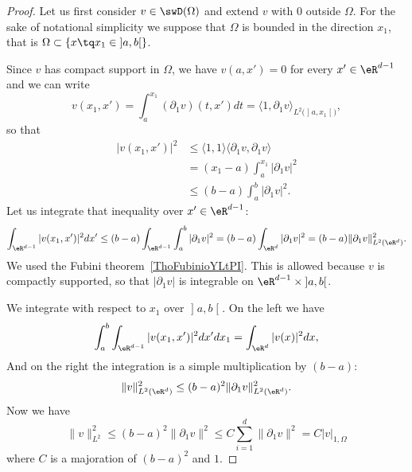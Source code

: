 \begin{proof}
	Let us first consider \( v\in\swD(\Omega)\) and extend \( v\) with \( 0\) outside \( \Omega\). For the sake of notational simplicity we suppose that \( \Omega\) is bounded in the direction \( x_1\), that is \( \Omega\subset \{ x\tq x_1\in \mathopen] a , b \mathclose[ \}\).

		Since \( v\) has compact support in \( \Omega\), we have \( v(a,x')=0\) for every \( x'\in \eR^{d-1}\) and we can write
		\begin{equation}
			v(x_1,x')=   \int_a^{x_1}(\partial_1v)(t,x')dt=\langle 1, \partial_1v\rangle_{L^2\big( \mathopen] a , x_1 \mathclose[ \big)},
		\end{equation}
		so that
		\begin{subequations}
			\begin{align}
				| v(x_1,x') |^2 & \leq \langle 1, 1\rangle \langle \partial_1v, \partial_1v\rangle \\
				                & =(x_1-a)\int_a^{x_1}| \partial_1 v|^2                            \\
				                & \leq(b-a)\int_a^b| \partial_1v |^2.
			\end{align}
		\end{subequations}
		Let us integrate that inequality over \( x'\in \eR^{d-1}\):
		\begin{equation}
			\int_{\eR^{d-1}}| v(x_1,x') |^2dx'\leq (b-a)\int_{\eR^{d-1}}\int_a^b| \partial_1v |^2=(b-a)\int_{\eR^d}| \partial_1v |^2=(b-a)\| \partial_1v \|^2_{L^2(\eR^d)}.
		\end{equation}
		We used the Fubini theorem~\ref{ThoFubinioYLtPI}. This is allowed because \( v\) is compactly supported, so that \( | \partial_1v |\) is integrable on \( \eR^{d-1}\times \mathopen] a , b \mathclose[\).

		We integrate with respect to \( x_1\) over \( \mathopen] a , b \mathclose[\). On the left we have
	\begin{equation}
		\int_a^b\int_{\eR^{d-1}}| v(x_1,x') |^2dx'dx_1=\int_{\eR^d}| v(x) |^2dx,
	\end{equation}
	And on the right the integration is a simple multiplication by \( (b-a)\):
	\begin{equation}
		\| v \|^2_{L^2(\eR^d)}\leq (b-a)^2\| \partial_1v \|^2_{L^2(\eR^d)}.
	\end{equation}
	Now we have
	\begin{equation}
		\| v \|^2_{L^2}\leq (b-a)^2\| \partial_1v \|^2\leq C\sum_{i=1}^d\| \partial_1v \|^2=C| v |_{1,\Omega}
	\end{equation}
	where \( C\) is a majoration of \( (b-a)^2\) and \( 1\).


\end{proof}
